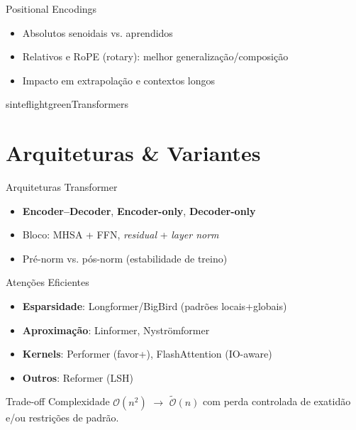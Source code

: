 \documentclass{beamer}
\begin{document}
\begin{frame}{Positional Encodings}
\begin{itemize}[<+->]
  \item Absolutos senoidais vs. aprendidos
  \item Relativos e RoPE (rotary): melhor generalização/composição
  \item Impacto em extrapolação e contextos longos
\end{itemize}
\end{frame}

\begin{chapter}{sinteflightgreen}{Transformers}\end{chapter}

\section{Arquiteturas \& Variantes}
\begin{frame}{Arquiteturas Transformer}
\begin{itemize}[<+->]
  \item \textbf{Encoder--Decoder}, \textbf{Encoder-only}, \textbf{Decoder-only}
  \item Bloco: MHSA + FFN, \textit{residual} + \textit{layer norm}
  \item Pré-norm vs. pós-norm (estabilidade de treino)
\end{itemize}
\end{frame}

\begin{frame}{Atenções Eficientes}
\begin{itemize}[<+->]
  \item \textbf{Esparsidade}: Longformer/BigBird (padrões locais+globais)
  \item \textbf{Aproximação}: Linformer, Nyströmformer
  \item \textbf{Kernels}: Performer (favor+), FlashAttention (IO-aware)
  \item \textbf{Outros}: Reformer (LSH)
\end{itemize}
\begin{block}{Trade-off}
Complexidade $\mathcal{O}(n^2)$ $\rightarrow$ $\tilde{\mathcal{O}}(n)$ com perda controlada de exatidão e/ou restrições de padrão.
\end{block}
\end{frame}
\end{document}

